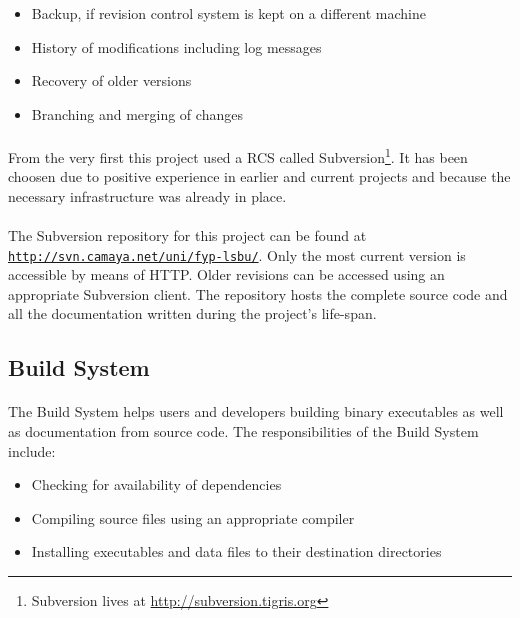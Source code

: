 \begin{itemize}
\item Backup, if revision control system is kept on a different machine
\item History of modifications including log messages
\item Recovery of older versions
\item Branching and merging of changes
\end{itemize}

\paragraph{}
From the very first this project used a RCS called Subversion\footnote{Subversion lives at \href{http://subversion.tigris.org}{http://subversion.tigris.org}}. It has been choosen due to positive experience in earlier and current projects and because the necessary infrastructure was already in place.

\paragraph{}
The Subversion repository for this project can be found at \\ \texttt{\href{http://svn.camaya.net/uni/fyp-lsbu/}{http://svn.camaya.net/uni/fyp-lsbu/}}. Only the most current version is accessible by means of HTTP. Older revisions can be accessed using an appropriate Subversion client. The repository hosts the complete source code and all the documentation written during the project's life-span.


\subsection{Build System}
\paragraph{}
The Build System helps users and developers building binary executables as well as documentation from source code. The responsibilities of the Build System include:

\begin{itemize}
\item Checking for availability of dependencies
\item Compiling source files using an appropriate compiler
\item Installing executables and data files to their destination directories
\end{itemize}

